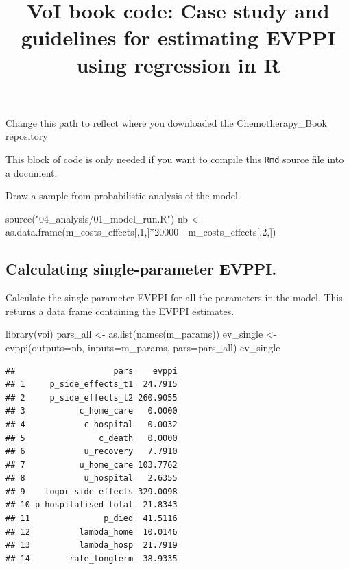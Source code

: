 \documentclass[
]{article}
\title{VoI book code: Case study and guidelines for estimating EVPPI
using regression in R}
\author{}
\date{\vspace{-2.5em}}
\newenvironment{Shaded}{\begin{snugshade}}{\end{snugshade}}
\newcommand{\AttributeTok}[1]{\textcolor[rgb]{0.77,0.63,0.00}{#1}}
\newcommand{\DecValTok}[1]{\textcolor[rgb]{0.00,0.00,0.81}{#1}}
\newcommand{\FunctionTok}[1]{\textcolor[rgb]{0.00,0.00,0.00}{#1}}
\newcommand{\NormalTok}[1]{#1}
\newcommand{\OtherTok}[1]{\textcolor[rgb]{0.56,0.35,0.01}{#1}}
\newcommand{\SpecialCharTok}[1]{\textcolor[rgb]{0.00,0.00,0.00}{#1}}
\newcommand{\StringTok}[1]{\textcolor[rgb]{0.31,0.60,0.02}{#1}}
\begin{document}
\maketitle

Change this path to reflect where you downloaded the Chemotherapy\_Book
repository

This block of code is only needed if you want to compile this
\texttt{Rmd} source file into a document.

Draw a sample from probabilistic analysis of the model.

\begin{Shaded}
\begin{Highlighting}[]
\FunctionTok{source}\NormalTok{(}\StringTok{"04\_analysis/01\_model\_run.R"}\NormalTok{)}
\NormalTok{nb }\OtherTok{\textless{}{-}} \FunctionTok{as.data.frame}\NormalTok{(m\_costs\_effects[,}\DecValTok{1}\NormalTok{,]}\SpecialCharTok{*}\DecValTok{20000} \SpecialCharTok{{-}}\NormalTok{ m\_costs\_effects[,}\DecValTok{2}\NormalTok{,])}
\end{Highlighting}
\end{Shaded}

\hypertarget{calculating-single-parameter-evppi.}{%
\subsection{Calculating single-parameter
EVPPI.}\label{calculating-single-parameter-evppi.}}

Calculate the single-parameter EVPPI for all the parameters in the
model. This returns a data frame containing the EVPPI estimates.

\begin{Shaded}
\begin{Highlighting}[]
\FunctionTok{library}\NormalTok{(voi)}
\NormalTok{pars\_all }\OtherTok{\textless{}{-}} \FunctionTok{as.list}\NormalTok{(}\FunctionTok{names}\NormalTok{(m\_params))}
\NormalTok{ev\_single }\OtherTok{\textless{}{-}} \FunctionTok{evppi}\NormalTok{(}\AttributeTok{outputs=}\NormalTok{nb, }\AttributeTok{inputs=}\NormalTok{m\_params, }\AttributeTok{pars=}\NormalTok{pars\_all)}
\NormalTok{ev\_single}
\end{Highlighting}
\end{Shaded}

\begin{verbatim}
##                    pars    evppi
## 1     p_side_effects_t1  24.7915
## 2     p_side_effects_t2 260.9055
## 3           c_home_care   0.0000
## 4            c_hospital   0.0032
## 5               c_death   0.0000
## 6            u_recovery   7.7910
## 7           u_home_care 103.7762
## 8            u_hospital   2.6355
## 9    logor_side_effects 329.0098
## 10 p_hospitalised_total  21.8343
## 11               p_died  41.5116
## 12          lambda_home  10.0146
## 13          lambda_hosp  21.7919
## 14        rate_longterm  38.9335
\end{verbatim}
\end{document}
